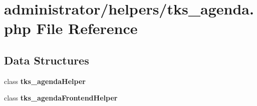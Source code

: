 \section{administrator/helpers/tks\+\_\+agenda.php File Reference}
\label{administrator_2helpers_2tks__agenda_8php}
\subsection*{Data Structures}
\begin{DoxyCompactItemize}
\item 
class \textbf{ tks\+\_\+agenda\+Helper}
\item 
class \textbf{ tks\+\_\+agenda\+Frontend\+Helper}
\end{DoxyCompactItemize}
